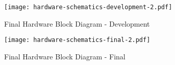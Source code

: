 

\begin{figure}
	\centering
	\texttt{[image: hardware-schematics-development-2.pdf]}
	\caption{Final Hardware Block Diagram - Development}
\end{figure}

\begin{figure}
	\centering
	\texttt{[image: hardware-schematics-final-2.pdf]}
	\caption{Final Hardware Block Diagram - Final}
\end{figure}